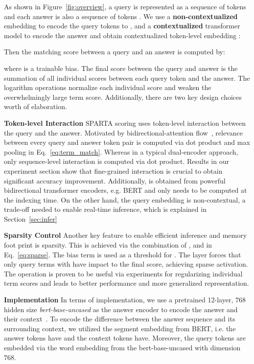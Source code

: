 \documentclass[11pt,a4paper]{article}
\begin{document}
As shown in Figure~\ref{fig:overview}, a query is represented as a sequence of tokens  and each answer is also a sequence of tokens . We use a \textbf{non-contextualized} embedding to encode the query tokens to , and a \textbf{contextualized} transformer model to encode the answer and obtain contextualized token-level embedding :


Then the matching score  between a query and an answer is computed by:

where  is a trainable bias. The final score between the query and answer is the summation of all individual scores between each query token and the answer. The logarithm operations normalize each individual score and weaken the overwhelmingly large term score. Additionally, there are two key design choices worth of elaboration.

\textbf{Token-level Interaction}
SPARTA scoring uses token-level interaction between the query and the answer. Motivated by bidirectional-attention flow~\cite{seo2016bidirectional}, relevance between every query and answer token pair is computed via dot product and max pooling in Eq.~\ref{eq:term_match}. Whereas in a typical dual-encoder approach, only sequence-level interaction is computed via dot product. Results in our experiment section show that fine-grained interaction is crucial to obtain significant accuracy improvement. Additionally,  is obtained from powerful bidirectional transformer encoders, e.g. BERT and only needs to be computed at the indexing time. On the other hand, the query embedding is non-contextual, a trade-off needed to enable real-time inference, which is explained in Section~\ref{sec:infer} 

\textbf{Sparsity Control}
Another key feature to enable efficient inference and memory foot print is sparsity. This is achieved via the combination of ,  and  in Eq.~\ref{eq:sparse}. The bias term is used as a threshold for . The  layer forces that only query terms with  have impact to the final score, achieving sparse activation. The  operation is proven to be useful via experiments for regularizing individual term scores and leads to better performance and more generalized representation.

\textbf{Implementation}
In terms of implementation, we use a pretrained 12-layer, 768 hidden size \textit{bert-base-uncased} as the answer encoder to encode the answer and their context~\cite{devlin2018bert}. To encode the difference between the answer sequence and its surrounding context, we utilized the segment embedding from BERT, i.e. the answer tokens have  and the context tokens have. Moreover, the query tokens are embedded via the word embedding from the bert-base-uncased with dimension 768.    
\end{document}
